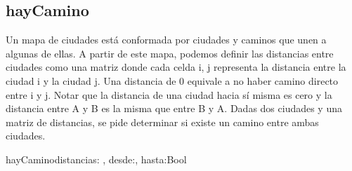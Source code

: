 \documentclass[10pt,a4paper]{article}
\begin{document}
\subsection {hayCamino}
 Un mapa de ciudades está conformada por ciudades y caminos que unen a algunas de ellas. A partir de
este mapa, podemos definir las distancias entre ciudades como una matriz donde cada celda i, j representa la distancia
entre la ciudad i y la ciudad j. Una distancia de 0 equivale a no haber camino directo entre i y j. Notar que
la distancia de una ciudad hacia sí misma es cero y la distancia entre A y B es la misma que entre B y A.
Dadas dos ciudades y una matriz de distancias, se pide determinar si existe un camino entre ambas ciudades.
\vspace{0.2cm}
\begin{proc}{hayCamino}{\In distancias: \TLista{\TLista{\ent}}, \In desde:\ent , \In hasta:\ent }{Bool}

	
\vspace{0.2cm}
	
\end{proc}
\vspace{0.2cm}


\vspace{0.2cm}
\end{document}
